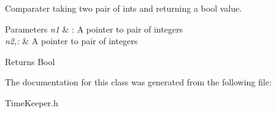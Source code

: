 \-Comparater taking two pair of ints and returning a bool value. 


\begin{DoxyParams}{\-Parameters}
{\em n1} & \-: \-A pointer to pair of integers \\
\hline
{\em n2,\-:} & \-A pointer to pair of integers \\
\hline
\end{DoxyParams}
\begin{DoxyReturn}{\-Returns}
\-Bool 
\end{DoxyReturn}


\-The documentation for this class was generated from the following file\-:\begin{DoxyCompactItemize}
\item 
\-Time\-Keeper.\-h\end{DoxyCompactItemize}
